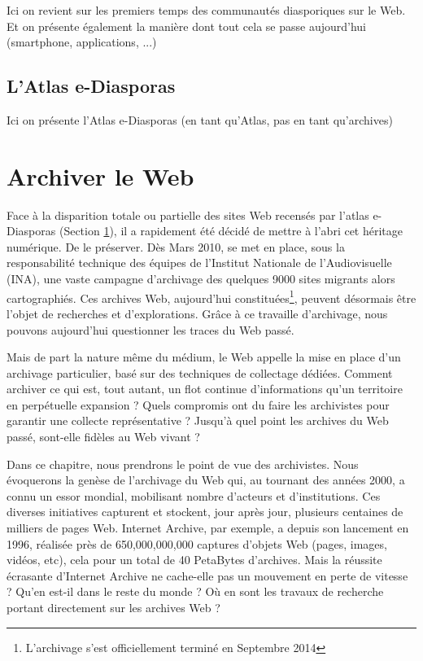 \documentclass[symmetric,justified,marginals=raggedouter]{tufte-book}
\begin{document}
\noindent Ici on revient sur les premiers temps des communautés diasporiques sur le Web. Et on présente également la manière dont tout cela se passe aujourd'hui (smartphone, applications, ...)

\section{L'Atlas e-Diasporas}
\label{sec:2_atlas}

\noindent Ici on présente l'Atlas e-Diasporas (en tant qu'Atlas, pas en tant qu'archives)


\chapter{Archiver le Web}
\label{chap:3}

\noindent Face à la disparition totale ou partielle des sites Web recensés par l'atlas e-Diasporas (Section \ref{sec:2_atlas}), il a rapidement été décidé de mettre à l'abri cet héritage numérique. De le préserver. Dès Mars 2010, se met en place, sous la responsabilité technique des équipes de l'Institut Nationale de l'Audiovisuelle (INA), une vaste campagne d'archivage des quelques 9000 sites migrants alors cartographiés. Ces archives Web, aujourd'hui constituées\footnote{L'archivage s'est officiellement terminé en Septembre 2014}, peuvent désormais être l'objet de recherches et d'explorations. Grâce à ce travaille d'archivage, nous pouvons aujourd'hui questionner les traces du Web passé. 

Mais de part la nature même du médium, le Web appelle la mise en place d'un archivage particulier, basé sur des techniques de collectage dédiées. Comment archiver ce qui est, tout autant, un flot continue d'informations qu'un territoire en perpétuelle expansion ? Quels compromis ont du faire les archivistes pour garantir une collecte représentative ? Jusqu'à quel point les archives du Web passé, sont-elle fidèles au Web vivant ? 

Dans ce chapitre, nous prendrons le point de vue des archivistes. Nous évoquerons la genèse de l'archivage du Web qui, au tournant des années 2000, a connu un essor mondial, mobilisant nombre d'acteurs et d'institutions. Ces diverses initiatives capturent et stockent, jour après jour, plusieurs centaines de milliers de pages Web. Internet Archive, par exemple, a depuis son lancement en 1996, réalisée près de 650,000,000,000 captures d'objets Web (pages, images, vidéos, etc), cela pour un total de 40 PetaBytes d'archives. Mais la réussite écrasante d'Internet Archive ne cache-elle pas un mouvement en perte de vitesse ? Qu'en est-il dans le reste du monde ? Où en sont les travaux de recherche portant directement sur les archives Web ?
\end{document}
